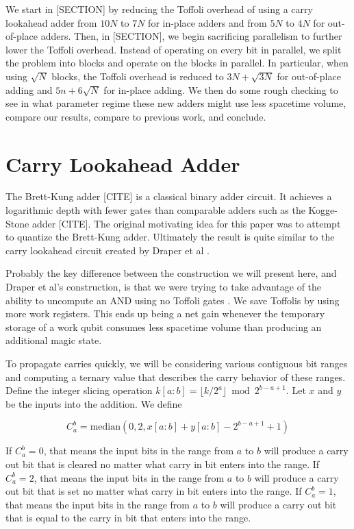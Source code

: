 \documentclass[onecolumn,unpublished]{quantumarticle}
\theoremstyle{definition}
\theoremstyle{definition}
\theoremstyle{definition}
\begin{document}
We start in [SECTION] by reducing the Toffoli overhead of using a carry lookahead adder from $10N$ to $7N$ for in-place adders and from $5N$ to $4N$ for out-of-place adders.
Then, in [SECTION], we begin sacrificing parallelism to further lower the Toffoli overhead.
Instead of operating on every bit in parallel, we split the problem into blocks and operate on the blocks in parallel.
In particular, when using $\sqrt{N}$ blocks, the Toffoli overhead is reduced to $3N + \sqrt{3N}$ for out-of-place adding and $5n + 6\sqrt{N}$ for in-place adding.
We then do some rough checking to see in what parameter regime these new adders might use less spacetime volume, compare our results, compare to previous work, and conclude.

\section{Carry Lookahead Adder}

The Brett-Kung adder [CITE] is a classical binary adder circuit.
It achieves a logarithmic depth with fewer gates than comparable adders such as the Kogge-Stone adder [CITE].
The original motivating idea for this paper was to attempt to quantize the Brett-Kung adder.
Ultimately the result is quite similar to the carry lookahead circuit created by Draper et al \cite{draper2004lookaheadadder}.

Probably the key difference between the construction we will present here, and Draper et al's construction, is that we were trying to take advantage of the ability to uncompute an AND using no Toffoli gates \cite{gidney2018halving}.
We save Toffolis by using more work registers.
This ends up being a net gain whenever the temporary storage of a work qubit consumes less spacetime volume than producing an additional magic state.

To propagate carries quickly, we will be considering various contiguous bit ranges and computing a ternary value that describes the carry behavior of these ranges.
Define the integer slicing operation $k[a:b] = \lfloor k/2^a \rfloor \bmod 2^{b-a+1}$.
Let $x$ and $y$ be the inputs into the addition.
We define

$$C_a^b = \text{median}(0, 2, x[a:b] + y[a:b] - 2^{b - a + 1} + 1)$$

If $C_a^b = 0$, that means the input bits in the range from $a$ to $b$ will produce a carry out bit that is cleared no matter what carry in bit enters into the range.
If $C_a^b = 2$, that means the input bits in the range from $a$ to $b$ will produce a carry out bit that is set no matter what carry in bit enters into the range.
If $C_a^b = 1$, that means the input bits in the range from $a$ to $b$ will produce a carry out bit that is equal to the carry in bit that enters into the range.
\end{document}
